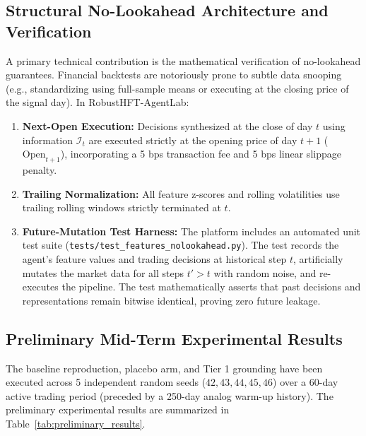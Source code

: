 \documentclass[11pt,a4paper]{article}
\begin{document}
\subsection{Structural No-Lookahead Architecture and Verification}
A primary technical contribution is the mathematical verification of no-lookahead guarantees. Financial backtests are notoriously prone to subtle data snooping (e.g., standardizing using full-sample means or executing at the closing price of the signal day). In RobustHFT-AgentLab:
\begin{enumerate}
    \item \textbf{Next-Open Execution:} Decisions synthesized at the close of day $t$ using information $\mathcal{I}_t$ are executed strictly at the opening price of day $t+1$ ($\text{Open}_{t+1}$), incorporating a 5 bps transaction fee and 5 bps linear slippage penalty.
    \item \textbf{Trailing Normalization:} All feature z-scores and rolling volatilities use trailing rolling windows strictly terminated at $t$.
    \item \textbf{Future-Mutation Test Harness:} The platform includes an automated unit test suite (\texttt{tests/test\_features\_nolookahead.py}). The test records the agent's feature values and trading decisions at historical step $t$, artificially mutates the market data for all steps $t' > t$ with random noise, and re-executes the pipeline. The test mathematically asserts that past decisions and representations remain bitwise identical, proving zero future leakage.
\end{enumerate}

\subsection{Preliminary Mid-Term Experimental Results}
The baseline reproduction, placebo arm, and Tier 1 grounding have been executed across 5 independent random seeds ($42, 43, 44, 45, 46$) over a 60-day active trading period (preceded by a 250-day analog warm-up history). The preliminary experimental results are summarized in Table~\ref{tab:preliminary_results}.
\end{document}
